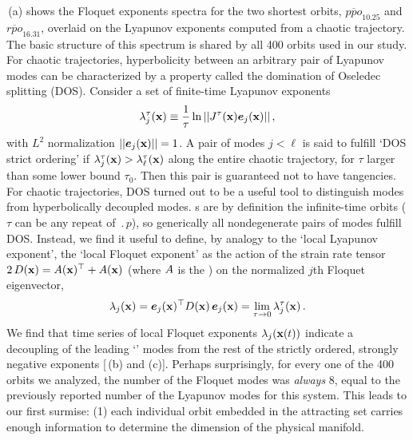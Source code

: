 \documentclass[prl,aps,preprint,showpacs,superscriptaddress]{revtex4-1} %
\begin{document}
\,(a) shows the Floquet exponents spectra for the two
shortest orbits, $\overline{ppo}_{10.25}$ and $\overline{rpo}_{16.31}$,
overlaid on the Lyapunov exponents computed from a chaotic trajectory.
The basic structure of this spectrum is shared by all 400
orbits used in our study.
For chaotic trajectories, hyperbolicity between an arbitrary pair of
Lyapunov modes can be characterized by a property called the domination
of Oseledec splitting (DOS).
Consider a set of finite-time Lyapunov exponents
\begin{equation}
 \lambda_j^\tau(\mathrm{\mathbf{x}})
 \equiv
 \frac{1}{\tau}\ln ||J^\tau(\mathrm{\mathbf{x}})\bm{e}_j(\mathrm{\mathbf{x}})||
\,,
\label{eq:ftle}
\end{equation}
with $L^2$ normalization $||\bm{e}_j(\mathrm{\mathbf{x}})||=1$.
A pair of modes $j<\ell$ is said to fulfill `DOS strict ordering'
if $\lambda_{j}^\tau(\mathrm{\mathbf{x}})>\lambda_{\ell}^\tau(\mathrm{\mathbf{x}})$
along the entire chaotic trajectory, for $\tau$ larger than some lower
bound $\tau_0$. Then this pair is guaranteed not to have
tangencies.
For chaotic trajectories, DOS turned out to be a useful tool to
distinguish {\entangled} modes from hyperbolically decoupled {\transient}
modes.
\Po s are by definition the infinite-time orbits  ($\tau$ can be any repeat
of $\period{p}$), so generically all nondegenerate pairs of modes fulfill DOS.
Instead, we find it useful to define, by analogy to the `local Lyapunov
exponent', the `local Floquet exponent' as the action of
the strain rate tensor
\(
2\,D(\mathrm{\mathbf{x}}) = {A(\mathrm{\mathbf{x}})}{}^\top+A(\mathrm{\mathbf{x}})
\)
(where $A$ is the \stabmat) on the normalized
$j$th Floquet eigenvector,
\begin{equation}
\lambda_{j}(\mathrm{\mathbf{x}})
= {\bm{e}_j(\mathrm{\mathbf{x}})}{}^\top D(\mathrm{\mathbf{x}})\,\bm{e}_j(\mathrm{\mathbf{x}})
= \lim_{\tau\rightarrow 0}\lambda_j^\tau(\mathrm{\mathbf{x}})
\,.
\label{strainRateTens}
\end{equation}
We find that time series of local Floquet exponents $\lambda_j(\mathrm{\mathbf{x}}(t))$
indicate a decoupling of the leading
`\entangled' modes from the rest of the strictly ordered, strongly
negative exponents [\,(b) and (c)].
Perhaps surprisingly, for every one of the 400 orbits we analyzed, the
number of the {\entangled} Floquet modes was \textit{always} 8, equal to the
previously reported number of the {\entangled} Lyapunov modes for this
system.
This leads to our first surmise: (1) each individual orbit embedded in
the attracting set carries enough information to determine the  dimension
of the physical manifold.
\end{document}
